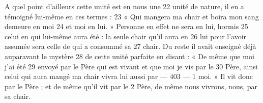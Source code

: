 A quel point d'ailleurs cette unité est en nous une	 
22	 	unité de nature, il en a témoigné lui-même en ces termes :	 
23	 	« Qui mangera ma chair et boira mon sang demeure en moi	 
24	 	et moi en lui. » Personne en effet ne sera en lui, hormis	 
25	 	celui en qui lui-même aura été : la seule chair qu'il aura en	 
26	 	lui pour l'avoir assumée sera celle de qui a consommé sa	 
27	 	chair. Du reste il avait enseigné déjà auparavant le mystère	 
28	 	de cette unité parfaite en disant : « De même que moi j'ai été	 
29	 	envoyé par le Père qui est vivant et que moi je vis par le	 
30	 	Père, ainsi celui qui aura mangé ma chair vivra lui aussi par	 
 	--- 403 ---	 
1	 	moi. » Il vit donc par le Père ; et de même qu'il vit par le	 
2	 	Père, de même nous vivrons, nous, par sa chair.